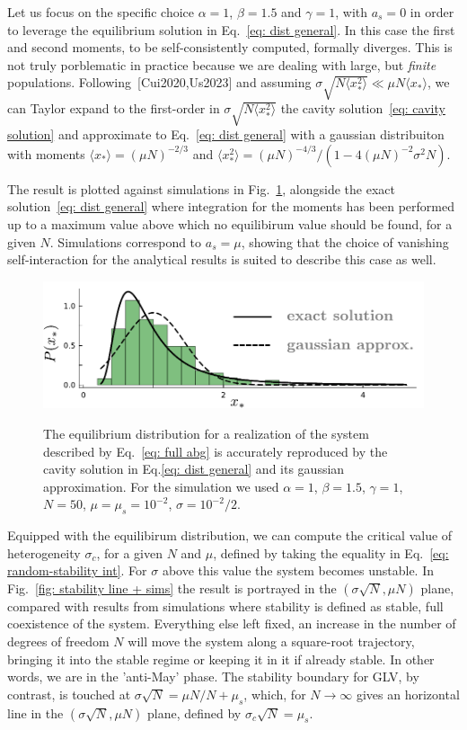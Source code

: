 \documentclass[%
 reprint,
 amsmath,amssymb,
 aps,
]{revtex4-2}
\begin{document}
Let us focus on the specific choice 
$\alpha=1$, $\beta=1.5$ and $\gamma=1$, with
$a_s=0$ in order to leverage the equilibrium solution in Eq.~\eqref{eq: dist general}.
In this case the first and second moments, 
to be self-consistently computed, formally diverges. This is not truly porblematic in practice
because we are dealing with large, but \emph{finite} populations.
Following~[Cui2020,Us2023] and assuming
$\sigma \sqrt{N\langle x_*^2\rangle}\ll \mu N \langle x_* \rangle$,
we can Taylor expand to the first-order in 
$\sigma \sqrt{N\langle x_*^2\rangle}$ the cavity 
solution~\eqref{eq: cavity solution} and 
approximate to Eq.~\eqref{eq: dist general} with
a gaussian distribuiton
with moments $\langle x_*\rangle=(\mu N)^{-2/3}$ and
$\langle x_*^2\rangle=(\mu N)^{-4/3}/(1-4(\mu N)^{-2}\sigma^2N)$.

The result is plotted against simulations in 
Fig.~\ref{fig: cavity sol.}, alongside the exact 
solution~\eqref{eq: dist general} 
where integration for the moments has been performed up to a maximum
value above which no equilibirum value should 
be found, for a given $N$.
Simulations correspond to $a_s=\mu$, showing that the choice
of vanishing self-interaction for the analytical results
is suited to describe this case as well.

\begin{figure}[h!]
    \centering
    \includegraphics[width=.45\textwidth]{figs/cavity.pdf}
    \label{fig: cavity sol.}
    \caption{The equilibrium distribution for a realization
    of the system described by Eq.~\eqref{eq: full abg} 
    is accurately reproduced by the cavity solution in 
    Eq.\eqref{eq: dist general} and its gaussian approximation.
    For the simulation we used  $\alpha=1$, $\beta=1.5$,
    $\gamma=1$, $N=50$, $\mu=\mu_s=10^{-2}$, $\sigma=10^{-2}/2$.}
\end{figure}

Equipped with the equilibirum distribution, we can compute
the critical value of heterogeneity 
$\sigma_c$, for a given $N$ and $\mu$,
defined by taking the equality in 
Eq.~\eqref{eq: random-stability int}. 
For $\sigma$ above this value the system becomes
unstable. In Fig.~\ref{fig: stability line + sims}
the result is portrayed in the $(\sigma \sqrt{N},\mu N)$ plane,
compared with results from simulations where stability is defined
as stable, full coexistence of the system.
Everything else left fixed, an increase in the number of
degrees of freedom $N$ will move the system along a square-root
trajectory, bringing it into the stable regime or keeping it
in it if already stable. In other words, we are in the
'anti-May' phase. The stability boundary for GLV, by contrast, is touched
at $\sigma \sqrt{N} = \mu N/N + \mu_s$, which, for $N\to \infty$
gives an horizontal line in the $(\sigma \sqrt{N},\mu N)$ plane,
defined by $\sigma_c\sqrt{N} = \mu_s$.
\end{document}
